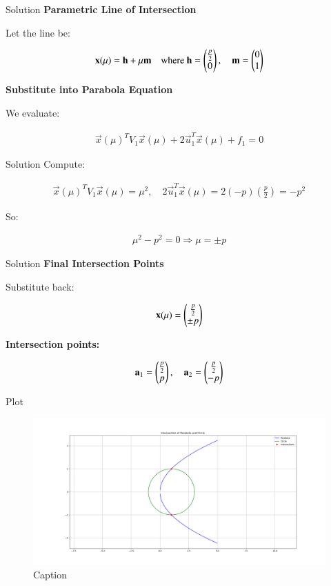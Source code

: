 \documentclass{beamer}
\begin{document}
\begin{frame}{Solution}
\textbf{Parametric Line of Intersection}

Let the line be:


\begin{align}
\mathbf{x}(\mu) = \mathbf{h} + \mu \mathbf{m}
\quad \text{where } \mathbf{h} = \begin{pmatrix}\frac{p}{2} \\ 0\end{pmatrix}, \quad
\mathbf{m} = \begin{pmatrix}0 \\ 1\end{pmatrix}
\end{align}



\textbf{Substitute into Parabola Equation}

We evaluate:


\begin{align}
\vec{x}(\mu)^T V_1 \vec{x}(\mu) + 2 \vec{u}_1^T \vec{x}(\mu) + f_1 = 0
\end{align}
\end{frame}


\begin{frame}{Solution}
Compute:


\begin{align}
\vec{x}(\mu)^T V_1 \vec{x}(\mu) = \mu^2, \quad
2 \vec{u}_1^T \vec{x}(\mu) = 2(-p)(\frac{p}{2}) = -p^2
\end{align}



So:


\begin{align}
\mu^2 - p^2 = 0 \Rightarrow \mu = \pm p
\end{align}
\end{frame}


\begin{frame}{Solution}
\textbf{Final Intersection Points}

Substitute back:

\begin{align}
\mathbf{x}(\mu) = \begin{pmatrix}\frac{p}{2} \\ \pm p\end{pmatrix}
\end{align}

\textbf{Intersection points:}

\begin{align}
\mathbf{a}_1 = \begin{pmatrix}\frac{p}{2} \\ p\end{pmatrix}, \quad
\mathbf{a}_2 = \begin{pmatrix}\frac{p}{2} \\ -p\end{pmatrix}
\end{align}
\end{frame}


\begin{frame}{Plot}
    \begin{figure}
        \centering
        \includegraphics[width=0.8\linewidth]{./figs/Figure_1.png}
        \caption{Caption}
        \label{fig:placeholder}
    \end{figure}
\end{frame}
\end{document}
